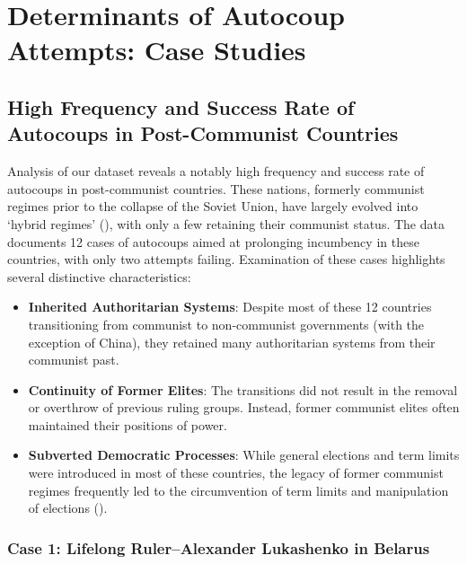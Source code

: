 \documentclass[
  12pt,
]{report}
\begin{document}
\section{Determinants of Autocoup Attempts: Case
Studies}\label{determinants-of-autocoup-attempts-case-studies}

\subsection{High Frequency and Success Rate of Autocoups in
Post-Communist
Countries}\label{high-frequency-and-success-rate-of-autocoups-in-post-communist-countries}

Analysis of our dataset reveals a notably high frequency and success
rate of autocoups in post-communist countries. These nations, formerly
communist regimes prior to the collapse of the Soviet Union, have
largely evolved into `hybrid regimes'
(), with only a
few retaining their communist status. The data documents 12 cases of
autocoups aimed at prolonging incumbency in these countries, with only
two attempts failing. Examination of these cases highlights several
distinctive characteristics:

\begin{itemize}
\item
  \textbf{Inherited Authoritarian Systems}: Despite most of these 12
  countries transitioning from communist to non-communist governments
  (with the exception of China), they retained many authoritarian
  systems from their communist past.
\item
  \textbf{Continuity of Former Elites}: The transitions did not result
  in the removal or overthrow of previous ruling groups. Instead, former
  communist elites often maintained their positions of power.
\item
  \textbf{Subverted Democratic Processes}: While general elections and
  term limits were introduced in most of these countries, the legacy of
  former communist regimes frequently led to the circumvention of term
  limits and manipulation of elections
  ().
\end{itemize}

\subsubsection*{Case 1: Lifelong Ruler--Alexander Lukashenko in
Belarus}\label{case-1-lifelong-ruleralexander-lukashenko-in-belarus}
\end{document}
